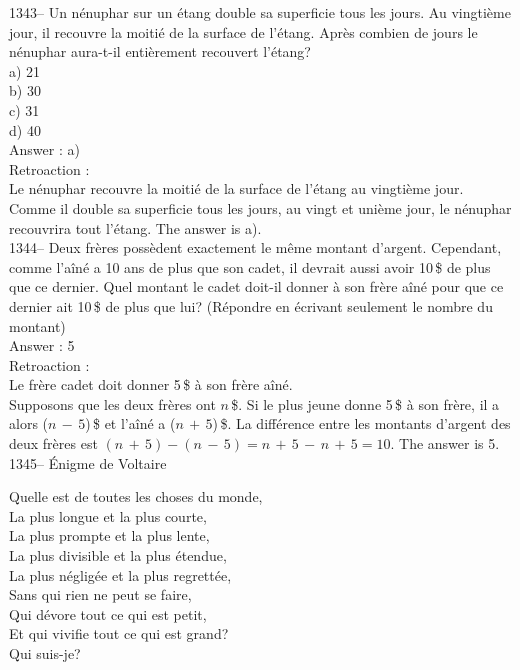 ﻿\documentclass[letterpaper, 12pt]{article}
\begin{document}
1343-- Un n\'enuphar sur un \'etang double sa superficie tous les jours.  Au
vingti\`eme jour, il recouvre la moiti\'e de la surface de l'\'etang.
Apr\`es combien de jours le n\'enuphar aura-t-il enti\`erement recouvert
l'\'etang?\\
a) 21\\
b) 30\\
c) 31\\
d) 40\\

Answer : a)\\

Retroaction : \\
Le n\'enuphar recouvre la moiti\'e de la surface de l'\'etang au vingti\`eme
jour.  Comme il double sa superficie tous les jours, au vingt et uni\`eme
jour, le n\'enuphar recouvrira tout l'\'etang.  The answer is a).\\

1344-- Deux fr\`eres poss\`edent exactement le m\^eme montant d'argent.
Cependant, comme l'a\^in\'e a 10 ans de plus que son cadet, il devrait aussi
avoir 10\,\$ de plus que ce dernier. Quel montant le cadet doit-il donner
\`a son fr\`ere a\^in\'e pour que ce dernier ait 10\,\$ de plus que lui?
(R\'epondre en \'ecrivant seulement le nombre du montant)\\

Answer : 5\\

Retroaction : \\
Le fr\`ere cadet doit donner 5\,\$ \`a son fr\`ere a\^in\'e.  \\
Supposons que les deux fr\`eres ont $n$\,\$.  Si le plus jeune donne 5\,\$
\`a son fr\`ere, il a alors ($n\,-\,5$)\,\$ et l'a\^in\'e a ($n\,+\,5$)\,\$.
  La diff\'erence entre les montants d'argent des deux fr\`eres est
$(n\,+\,5)-(n\,-\,5)=n\,+\,5\,-\,n\,+\,5=10$.  The answer is 5.\\

1345-- \'Enigme de Voltaire\\
\begin{center}{Quelle est de toutes les choses du monde,\\
La plus longue et la plus courte,\\
La plus prompte et la plus lente,\\
La plus divisible et la plus \'etendue,\\
La plus n\'eglig\'ee et la plus regrett\'ee,\\
Sans qui rien ne peut se faire,\\
Qui d\'evore tout ce qui est petit,\\
Et qui vivifie tout ce qui est grand?\\
Qui suis-je?\\}
\end{center}
\end{document}
